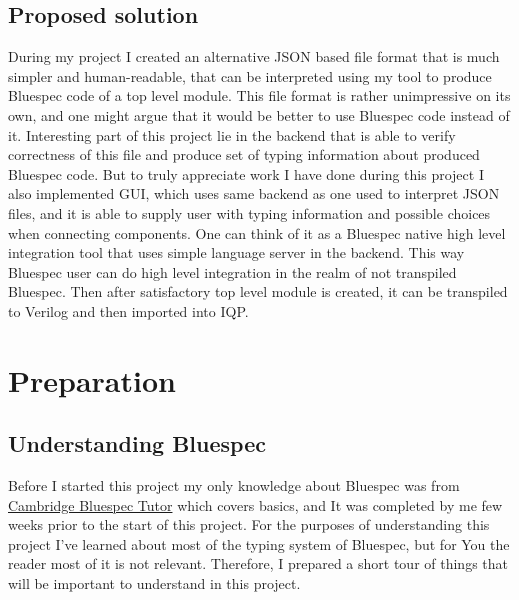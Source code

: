 \documentclass[14pt]{report}
\begin{document}
\section{Proposed solution}
During my project I created an alternative JSON based file format that is much simpler and human-readable, that can be interpreted using my tool to produce Bluespec code of a top level module.
This file format is rather unimpressive on its own, and one might argue that it would be better to use Bluespec code instead of it. Interesting part of this project lie in the backend that is able to verify correctness of this file and produce set of typing information about produced Bluespec code.
But to truly appreciate work I have done during this project I also implemented GUI, which uses same backend as one used to interpret JSON files, and it is able to supply user with typing information and possible choices when connecting components. 
One can think of it as a Bluespec native high level integration tool that uses simple language server in the backend. This way Bluespec user can do high level integration in the realm of not transpiled Bluespec. Then after satisfactory top level module is created, it can be transpiled to Verilog and then imported into IQP.

\chapter{Preparation}

\section{Understanding Bluespec}
Before I started this project my only knowledge about Bluespec was from \href{https://www-bluespec.cl.cam.ac.uk/}{Cambridge Bluespec Tutor} which covers basics, and It was completed by me few weeks prior to the start of this project. For the purposes of understanding this project I've learned about most of the typing system of Bluespec, but for You the reader most of it is not relevant. Therefore, I prepared a short tour of things that will be important to understand in this project. 
\end{document}
